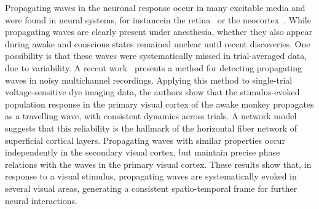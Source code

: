 \documentclass[brainsci, %
               review,accept,pdftex,moreauthors %
               ]{Definitions/mdpi}
\providecommand{\DIFadd}[1]{{\protect\color{blue}\uwave{#1}}} %
\providecommand{\DIFaddbegin}{} %
\providecommand{\DIFaddend}{} %
\newcommand{\DIFaddincludegraphics}[2][]{{\color{blue}\fbox{\DIFOincludegraphics[#1]{#2}}}} %
\DeclareRobustCommand{\DIFaddbegin}{\DIFOaddbegin \let\includegraphics\DIFaddincludegraphics} %
\DeclareRobustCommand{\DIFaddend}{\DIFOaddend \let\includegraphics\DIFOincludegraphics} %
\begin{document}
Propagating waves in the neuronal response occur in many excitable media and were found in neural systems, for instance\DIFaddbegin \DIFadd{, }\DIFaddend in the retina~\citep{feller_dynamic_1997} or the neocortex~\citep{bienenstock_model_1995}. While propagating waves are clearly present under anesthesia, whether they also appear during awake and conscious states remained unclear until recent discoveries. One possibility is that these waves were systematically missed in trial-averaged data, due to variability. A recent work~\citep{muller_stimulus-evoked_2014} presents a method for detecting propagating waves in noisy multichannel recordings. Applying this method to single-trial voltage-sensitive dye imaging data, the authors show that the stimulus-evoked population response in the primary visual cortex of the awake monkey propagates as a travelling wave, with consistent dynamics across trials. A network model suggests that this reliability is the hallmark of the horizontal fiber network of superficial cortical layers. Propagating waves with similar properties occur independently in the secondary visual cortex, but maintain precise phase relations with the waves in the primary visual cortex. These results show that, in response to a visual stimulus, propagating waves are systematically evoked in several visual areas, generating a consistent spatio-temporal frame for further neural interactions.
\end{document}
